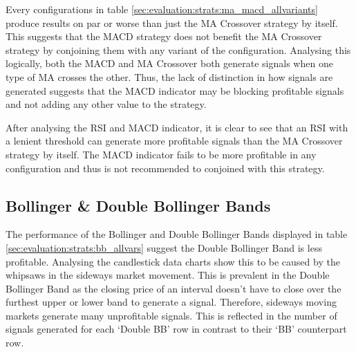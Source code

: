Every configurations in table \ref{sec:evaluation:strats:ma_macd_allvariants} produce results on par or worse than just the MA Crossover strategy by itself. This suggests that the MACD strategy does not benefit the MA Crossover strategy by conjoining them with any variant of the configuration. Analysing this logically, both the MACD and MA Crossover both generate signals when one type of MA crosses the other. Thus, the lack of distinction in how signals are generated suggests that the MACD indicator may be blocking profitable signals and not adding any other value to the strategy.

After analysing the RSI and MACD indicator, it is clear to see that an RSI with a lenient threshold can generate more profitable signals than the MA Crossover strategy by itself. The MACD indicator fails to be more profitable in any configuration and thus is not recommended to conjoined with this strategy.

\subsection{Bollinger \& Double Bollinger Bands}
\label{sec:evaluation:strats:bb_double_bb}

\noindent The performance of the Bollinger and Double Bollinger Bands displayed in table \ref{sec:evaluation:strats:bb_allvars} suggest the Double Bollinger Band is less profitable. Analysing the candlestick data charts show this to be caused by the whipsaws in the sideways market movement. This is prevalent in the Double Bollinger Band as the closing price of an interval doesn't have to close over the furthest upper or lower band to generate a signal. Therefore, sideways moving markets generate many unprofitable signals. This is reflected in the number of signals generated for each `Double BB' row in contrast to their `BB' counterpart row.

